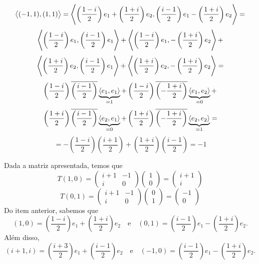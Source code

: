 \documentclass[11pt,a4paper]{article}
\begin{document}
{{\begin{itemize}
\[\left\langle (-1,1),(1,1) \right\rangle = \left\langle \left(\frac{1 - i}{2}\right)e_1 + \left(\frac{1+i}{2} \right)e_2, \left(\frac{i - 1}{2}\right)e_1 - \left(\frac{1+i}{2} \right)e_2 \right\rangle = \]\[
\left\langle \left(\frac{1 - i}{2}\right)e_1, \left(\frac{i - 1}{2}\right)e_1 \right\rangle + \left\langle \left(\frac{1 - i}{2}\right)e_1, - \left(\frac{1+i}{2} \right)e_2 \right\rangle + \]\[ \left\langle \left(\frac{1+i}{2} \right)e_2, \left(\frac{i - 1}{2}\right)e_1 \right\rangle + \left\langle \left(\frac{1+i}{2} \right)e_2, - \left(\frac{1+i}{2} \right)e_2 \right\rangle = 
\]\[
\left(\frac{1 - i}{2}\right) \overline{\left(\frac{i - 1}{2}\right)}  \underbrace{\left\langle e_1, e_1 \right\rangle}_{=1}+ \left(\frac{1 - i}{2}\right)\overline{  \left(-\frac{1+i}{2} \right) } \underbrace{\left\langle e_1, e_2 \right\rangle}_{=0}+\]\[ \left(\frac{1+i}{2} \right) \overline{\left(\frac{i - 1}{2}\right)} \underbrace{\left\langle e_2, e_1 \right\rangle}_{=0}+ \left(\frac{1+i}{2} \right) \overline{\left(-\frac{1+i}{2} \right)} \underbrace{\left\langle e_2, e_2 \right\rangle}_{=1}= \]\[
= -\left(\frac{1 - i}{2}\right) \left(\frac{i + 1}{2}\right) + \left(\frac{1+i}{2} \right) \left(\frac{i-1}{2} \right) = -1 
\]
\end{itemize}
\task[\pers{b}] Dada a matriz apresentada, temos que 
\[
T(1,0) = \begin{pmatrix}
  i+1 & -1 \\
  i & 0
  \end{pmatrix}\begin{pmatrix}
  1 \\
  0
  \end{pmatrix} = \begin{pmatrix}
  i+1 \\
  i
  \end{pmatrix}
\]
\[
T(0,1) = \begin{pmatrix}
  i+1 & -1 \\
  i & 0
  \end{pmatrix}\begin{pmatrix}
  0 \\
  1
  \end{pmatrix} = \begin{pmatrix}
  -1 \\
  0
  \end{pmatrix}
\]
Do item anterior, sabemos que 
\[
(1,0) = \left(\frac{1 - i}{2}\right)e_1 + \left(\frac{1+i}{2} \right)e_2 \quad \mbox{e} \quad (0,1) =  \left(\frac{i - 1}{2}\right)e_1 - \left(\frac{1+i}{2} \right)e_2.
\]
Além disso, 
\[
(i+1,i) = \left(\frac{i+3}{2}\right)e_1 + \left(\frac{i-1}{2} \right)e_2 \quad \mbox{e} \quad (-1,0) =  \left(\frac{i - 1}{2}\right)e_1 - \left(\frac{1+i}{2} \right)e_2.
\]
}

}
\end{document}
